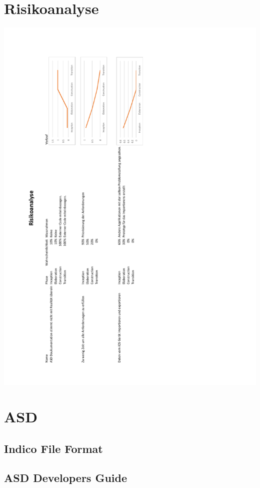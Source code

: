\section{Risikoanalyse}
\includegraphics[scale= 0.75]{resources/RisikoAnalyse.pdf}
\section{ASD}
\subsection{Indico File Format}

\subsection{ASD Developers Guide}
